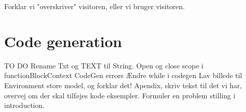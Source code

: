 Forklar vi "overskriver" visitoren, eller vi bruger visitoren.
\section{Code generation}


TO DO
Rename Txt og TEXT til String.
Open og close scope i functionBlockContext
CodeGen errors
Ændre while i codegen
Lav billede til Environment store model, og forklar det!
Apendix, skriv tekst til det vi har, overvej om der skal tilføjes kode eksempler.
Formuler en problem stilling i introduction.


